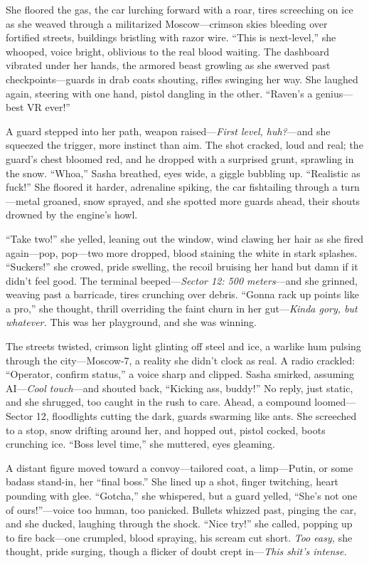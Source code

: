 \documentclass[12pt]{book}
\begin{document}
She floored the gas, the car lurching forward with a roar, tires screeching on ice as she weaved through a militarized Moscow—crimson skies bleeding over fortified streets, buildings bristling with razor wire. “This is next-level,” she whooped, voice bright, oblivious to the real blood waiting. The dashboard vibrated under her hands, the armored beast growling as she swerved past checkpoints—guards in drab coats shouting, rifles swinging her way. She laughed again, steering with one hand, pistol dangling in the other. “Raven’s a genius—best VR ever!”

A guard stepped into her path, weapon raised—\textit{First level, huh?}—and she squeezed the trigger, more instinct than aim. The shot cracked, loud and real; the guard’s chest bloomed red, and he dropped with a surprised grunt, sprawling in the snow. “Whoa,” Sasha breathed, eyes wide, a giggle bubbling up. “Realistic as fuck!” She floored it harder, adrenaline spiking, the car fishtailing through a turn—metal groaned, snow sprayed, and she spotted more guards ahead, their shouts drowned by the engine’s howl.

“Take two!” she yelled, leaning out the window, wind clawing her hair as she fired again—pop, pop—two more dropped, blood staining the white in stark splashes. “Suckers!” she crowed, pride swelling, the recoil bruising her hand but damn if it didn’t feel good. The terminal beeped—\textit{Sector 12: 500 meters}—and she grinned, weaving past a barricade, tires crunching over debris. “Gonna rack up points like a pro,” she thought, thrill overriding the faint churn in her gut—\textit{Kinda gory, but whatever.} This was her playground, and she was winning.

The streets twisted, crimson light glinting off steel and ice, a warlike hum pulsing through the city—Moscow-7, a reality she didn’t clock as real. A radio crackled: “Operator, confirm status,” a voice sharp and clipped. Sasha smirked, assuming AI—\textit{Cool touch}—and shouted back, “Kicking ass, buddy!” No reply, just static, and she shrugged, too caught in the rush to care. Ahead, a compound loomed—Sector 12, floodlights cutting the dark, guards swarming like ants. She screeched to a stop, snow drifting around her, and hopped out, pistol cocked, boots crunching ice. “Boss level time,” she muttered, eyes gleaming.

A distant figure moved toward a convoy—tailored coat, a limp—Putin, or some badass stand-in, her “final boss.” She lined up a shot, finger twitching, heart pounding with glee. “Gotcha,” she whispered, but a guard yelled, “She’s not one of ours!”—voice too human, too panicked. Bullets whizzed past, pinging the car, and she ducked, laughing through the shock. “Nice try!” she called, popping up to fire back—one crumpled, blood spraying, his scream cut short. \textit{Too easy,} she thought, pride surging, though a flicker of doubt crept in—\textit{This shit’s intense.}
\end{document}
